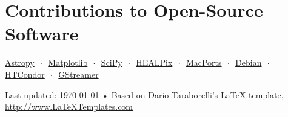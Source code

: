 \documentclass[10pt, letterpaper]{article} %
\newcommand{\listsep}{$\,\cdot\,$}
\begin{document}

\section*{Contributions to Open-Source Software}

\href{http://www.astropy.org}{Astropy} \listsep{} \href{http://matplotlib.org}{Matplotlib} \listsep{} \href{http://www.scipy.org}{SciPy} \listsep{} \href{http://healpix.jpl.nasa.gov}{HEALPix} \listsep{} \href{http://www.macports.org/}{MacPorts} \listsep{} \href{https://www.debian.org}{Debian} \listsep{} \href{http://research.cs.wisc.edu/htcondor/}{HTCondor} \listsep{} \href{http://gstreamer.net}{GStreamer}

%

\vfill{} %


\begin{center}
{\scriptsize Last updated: \today\- •\- Based on Dario Taraborelli's LaTeX template, \href{http://www.LaTeXTemplates.com}{http://www.LaTeXTemplates.com}} %
\end{center}

\end{document}
